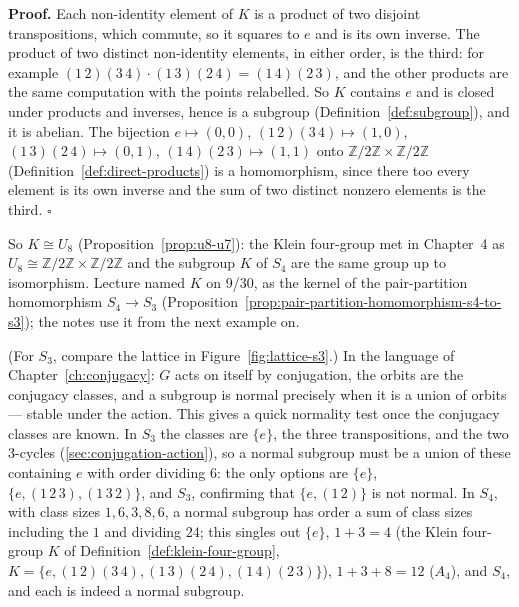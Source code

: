 \documentclass[11pt]{report}
\renewenvironment{proof}[1][Proof]{\noindent\textbf{#1.} }{\hfill$\square$\par\vspace{5pt}}
\begin{document}
\begin{proof}
Each non-identity element of $K$ is a product of two disjoint transpositions, which commute, so it squares to $e$ and is its own inverse. The product of two distinct non-identity elements, in either order, is the third: for example $(1\,2)(3\,4) \cdot (1\,3)(2\,4) = (1\,4)(2\,3)$, and the other products are the same computation with the points relabelled. So $K$ contains $e$ and is closed under products and inverses, hence is a subgroup (Definition~\ref{def:subgroup}), and it is abelian. The bijection $e \mapsto (0,0)$, $(1\,2)(3\,4) \mapsto (1,0)$, $(1\,3)(2\,4) \mapsto (0,1)$, $(1\,4)(2\,3) \mapsto (1,1)$ onto $\mathbb{Z}/2\mathbb{Z} \times \mathbb{Z}/2\mathbb{Z}$ (Definition~\ref{def:direct-products}) is a homomorphism, since there too every element is its own inverse and the sum of two distinct nonzero elements is the third.
\end{proof}

So $K \cong U_8$ (Proposition~\ref{prop:u8-u7}): the Klein four-group met in Chapter~4 as $U_8 \cong \mathbb{Z}/2\mathbb{Z} \times \mathbb{Z}/2\mathbb{Z}$ and the subgroup $K$ of $S_4$ are the same group up to isomorphism. Lecture named $K$ on 9/30, as the kernel of the pair-partition homomorphism $S_4 \to S_3$ (Proposition~\ref{prop:pair-partition-homomorphism-s4-to-s3}); the notes use it from the next example on.

\begin{exbox}\label{ex:normal-subgroups-s3-s4}
(For $S_3$, compare the lattice in Figure~\ref{fig:lattice-s3}.) In the language of Chapter~\ref{ch:conjugacy}: $G$ acts on itself by conjugation, the orbits are the conjugacy classes, and a subgroup is normal precisely when it is a union of orbits --- stable under the action. This gives a quick normality test once the conjugacy classes are known. In $S_3$ the classes are $\{e\}$, the three transpositions, and the two $3$-cycles (\ref{sec:conjugation-action}), so a normal subgroup must be a union of these containing $e$ with order dividing $6$: the only options are $\{e\}$, $\{e, (1\,2\,3), (1\,3\,2)\}$, and $S_3$, confirming that $\{e, (1\,2)\}$ is not normal. In $S_4$, with class sizes $1, 6, 3, 8, 6$, a normal subgroup has order a sum of class sizes including the $1$ and dividing $24$; this singles out $\{e\}$, $1 + 3 = 4$ (the Klein four-group $K$ of Definition~\ref{def:klein-four-group}, $K = \{e, (1\,2)(3\,4), (1\,3)(2\,4), (1\,4)(2\,3)\}$), $1 + 3 + 8 = 12$ ($A_4$), and $S_4$, and each is indeed a normal subgroup.
\end{exbox}
\end{document}
